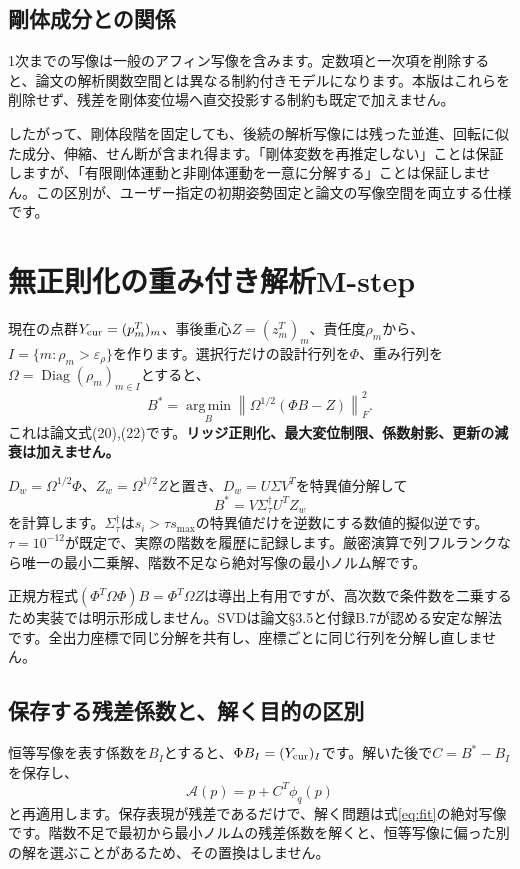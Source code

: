 \documentclass[a4paper,11pt]{article}
\newcommand{\diag}{\operatorname{Diag}}
\newcommand{\argmin}{\operatorname*{arg\,min}}
\newcommand{\norm}[1]{\left\lVert#1\right\rVert}
\numberwithin{equation}{section}
\begin{document}
\subsection{剛体成分との関係}
1次までの写像は一般のアフィン写像を含みます。定数項と一次項を削除すると、論文の解析関数空間とは異なる制約付きモデルになります。本版はこれらを削除せず、残差を剛体変位場へ直交投影する制約も既定で加えません。

したがって、剛体段階を固定しても、後続の解析写像には残った並進、回転に似た成分、伸縮、せん断が含まれ得ます。「剛体変数を再推定しない」ことは保証しますが、「有限剛体運動と非剛体運動を一意に分解する」ことは保証しません。この区別が、ユーザー指定の初期姿勢固定と論文の写像空間を両立する仕様です。

\section{無正則化の重み付き解析M-step}\label{sec:fit}
現在の点群\(Y_{\rm cur}=(p_m^T)_m\)、事後重心\(Z=(z_m^T)_m\)、責任度\(\rho_m\)から、\(I=\{m:\rho_m>\varepsilon_\rho\}\)を作ります。選択行だけの設計行列を\(\Phi\)、重み行列を\(\Omega=\diag(\rho_m)_{m\in I}\)とすると、
\begin{equation}
 B^*=\argmin_B\norm{\Omega^{1/2}(\Phi B-Z)}_F^2.\label{eq:fit}
\end{equation}
これは論文式(20),(22)です。\textbf{リッジ正則化、最大変位制限、係数射影、更新の減衰は加えません。}\cite{acpd}

\(D_w=\Omega^{1/2}\Phi\)、\(Z_w=\Omega^{1/2}Z\)と置き、\(D_w=U\Sigma V^T\)を特異値分解して
\begin{equation}
 B^*=V\Sigma_\tau^{\dagger}U^TZ_w
\end{equation}
を計算します。\(\Sigma_\tau^{\dagger}\)は\(s_i>\tau s_{\max}\)の特異値だけを逆数にする数値的擬似逆です。\(\tau=10^{-12}\)が既定で、実際の階数を履歴に記録します。厳密演算で列フルランクなら唯一の最小二乗解、階数不足なら絶対写像の最小ノルム解です。

正規方程式\((\Phi^T\Omega\Phi)B=\Phi^T\Omega Z\)は導出上有用ですが、高次数で条件数を二乗するため実装では明示形成しません。SVDは論文§3.5と付録B.7が認める安定な解法です。全出力座標で同じ分解を共有し、座標ごとに同じ行列を分解し直しません。

\subsection{保存する残差係数と、解く目的の区別}
恒等写像を表す係数を\(B_I\)とすると、\(\Phi B_I=(Y_{\rm cur})_I\)です。解いた後で\(C=B^*-B_I\)を保存し、
\begin{equation}
 \mathcal A(p)=p+C^T\phi_q(p)
\end{equation}
と再適用します。保存表現が残差であるだけで、解く問題は式\eqref{eq:fit}の絶対写像です。階数不足で最初から最小ノルムの残差係数を解くと、恒等写像に偏った別の解を選ぶことがあるため、その置換はしません。
\end{document}
